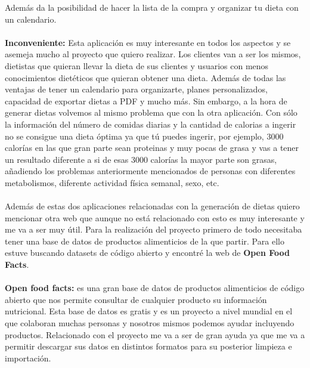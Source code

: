 Además da la posibilidad de hacer la lista de la compra y organizar tu dieta con un calendario.
\\\\
\textbf{Inconveniente:}
Esta aplicación es muy interesante en todos los aspectos y se asemeja mucho al proyecto que quiero realizar. Los clientes van a ser los mismos, dietistas que quieran llevar la dieta de sus clientes
y usuarios con menos conocimientos dietéticos que quieran obtener una dieta. Además de todas las ventajas de tener un calendario para organizarte, planes personalizados, capacidad de exportar dietas a PDF y mucho más.
Sin embargo, a la hora de generar dietas volvemos al mismo problema que con la otra aplicación. Con sólo la información del número de comidas diarias y la cantidad de calorias a ingerir
no se consigue una dieta óptima ya que tú puedes ingerir, por ejemplo, 3000 calorías en las que gran parte sean proteinas y muy pocas de grasa y vas a tener un resultado diferente a si de 
esas 3000 calorías la mayor parte son grasas, añadiendo los problemas anteriormente mencionados de personas con diferentes metabolismos, diferente actividad física semanal, sexo, etc.
\\\\ 
Además de estas dos aplicaciones relacionadas con la generación de dietas quiero mencionar otra web que aunque no está relacionado con esto es muy interesante y me va a ser muy útil.
Para la realización del proyecto primero de todo necesitaba tener una base de datos de productos alimenticios de la que partir. Para ello estuve buscando datasets de código abierto y encontré la web de \textbf{Open Food Facts}\cite{OpenFoodFacts}.
\\\\
\textbf{Open food facts:} es una gran base de datos de productos alimenticios de código abierto que nos permite consultar de cualquier producto su información nutricional.
Esta base de datos es gratis y es un proyecto a nivel mundial en el que colaboran muchas personas y nosotros mismos podemos ayudar incluyendo productos.
Relacionado con el proyecto me va a ser de gran ayuda ya que me va a permitir descargar sus datos en distintos formatos para su posterior limpieza e importación.


